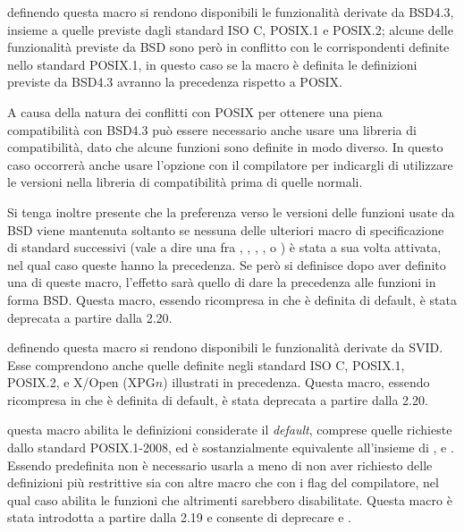 \begin{basedescript}{\desclabelwidth{2.7cm}\desclabelstyle{\nextlinelabel}}
\item[\macrod{\_BSD\_SOURCE}] definendo questa macro si rendono disponibili le
  funzionalità derivate da BSD4.3, insieme a quelle previste dagli standard
  ISO C, POSIX.1 e POSIX.2; alcune delle funzionalità previste da BSD sono
  però in conflitto con le corrispondenti definite nello standard POSIX.1, in
  questo caso se la macro è definita le definizioni previste da BSD4.3 avranno
  la precedenza rispetto a POSIX.

  A causa della natura dei conflitti con POSIX per ottenere una piena
  compatibilità con BSD4.3 può essere necessario anche usare una libreria di
  compatibilità, dato che alcune funzioni sono definite in modo diverso. In
  questo caso occorrerà anche usare l'opzione  con il
  compilatore per indicargli di utilizzare le versioni nella libreria di
  compatibilità prima di quelle normali.

  Si tenga inoltre presente che la preferenza verso le versioni delle funzioni
  usate da BSD viene mantenuta soltanto se nessuna delle ulteriori macro di
  specificazione di standard successivi (vale a dire una fra
  , , ,
  ,  o
  ) è stata a sua volta attivata, nel qual caso queste
  hanno la precedenza. Se però si definisce  dopo aver
  definito una di queste macro, l'effetto sarà quello di dare la precedenza
  alle funzioni in forma BSD. Questa macro, essendo ricompresa in
   che è definita di default, è stata deprecata a
  partire dalla  2.20.

\item[\macrod{\_SVID\_SOURCE}] definendo questa macro si rendono disponibili le
  funzionalità derivate da SVID. Esse comprendono anche quelle definite negli
  standard ISO C, POSIX.1, POSIX.2, e X/Open (XPG$n$) illustrati in
  precedenza. Questa macro, essendo ricompresa in 
  che è definita di default, è stata deprecata a partire dalla 
  2.20.

\item[\macrod{\_DEFAULT\_SOURCE}] questa macro abilita le definizioni
  considerate il \textit{default}, comprese quelle richieste dallo standard
  POSIX.1-2008, ed è sostanzialmente equivalente all'insieme di
  ,  e
  . Essendo predefinita non è necessario usarla a
  meno di non aver richiesto delle definizioni più restrittive sia con altre
  macro che con i flag del compilatore, nel qual caso abilita le funzioni che
  altrimenti sarebbero disabilitate. Questa macro è stata introdotta a partire
  dalla  2.19 e consente di deprecare  e
  .


\end{basedescript}
